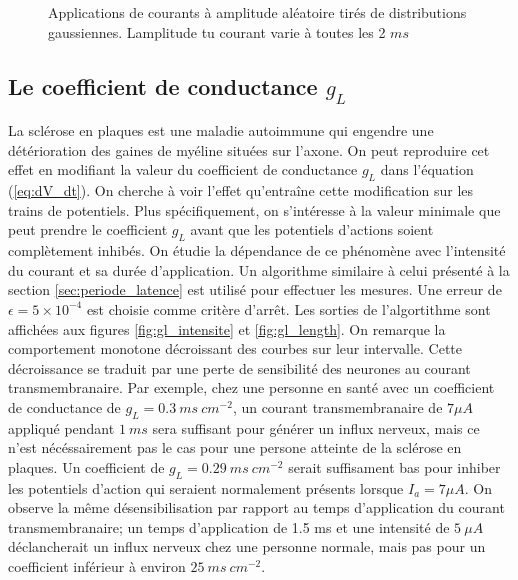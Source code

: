 \documentclass{article}
\begin{document}
\begin{figure}[H]
	\caption{Applications de courants à amplitude aléatoire tirés de distributions gaussiennes. Lamplitude tu courant varie à toutes les 2 $ms$}
	\label{fig:random}
\end{figure}

\subsection{Le coefficient de conductance $g_L$}\label{sec:sclerose_plaque}

La sclérose en plaques est une maladie autoimmune qui engendre une détérioration des gaines de myéline situées sur l'axone. On peut reproduire cet effet en modifiant la valeur du coefficient de conductance $g_L$ dans l'équation (\ref{eq:dV_dt}). On cherche à voir l'effet qu'entraîne cette modification sur les trains de potentiels. Plus spécifiquement, on s'intéresse à la valeur minimale que peut prendre le coefficient $g_L$ avant que les potentiels d'actions soient complètement inhibés. On étudie la dépendance de ce phénomène avec l'intensité du courant et sa durée d'application. Un algorithme similaire à celui présenté à la section \ref{sec:periode_latence} est utilisé pour effectuer les mesures. Une erreur de $\epsilon = 5 \times 10^{-4} $  est choisie comme critère d'arrêt. Les sorties de l'algortithme sont affichées aux figures \ref{fig:gl_intensite} et \ref{fig:gl_length}. On remarque la comportement monotone décroissant des courbes sur leur intervalle. Cette décroissance se traduit par une perte de sensibilité des neurones au courant transmembranaire. Par exemple, chez une personne en santé avec un coefficient de conductance de $g_L = 0.3\ ms\ cm^{-2}$, un courant transmembranaire de  $7 \mu A$ appliqué pendant $1\ ms$ sera suffisant pour générer un influx nerveux, mais ce n'est nécéssairement pas le cas pour une persone atteinte de la sclérose en plaques. Un coefficient de $g_L = 0.29\ ms\ cm^{-2}$ serait suffisament bas pour inhiber les potentiels d'action qui seraient normalement présents lorsque $I_a = 7 \mu A$. On observe la même désensibilisation par rapport au temps d'application du courant transmembranaire; un temps d'application de 1.5 ms et une intensité de $5\ \mu A$ déclancherait un influx nerveux chez une personne normale, mais pas pour un coefficient inférieur à environ $25\ ms\ cm^{-2}$.
\end{document}
